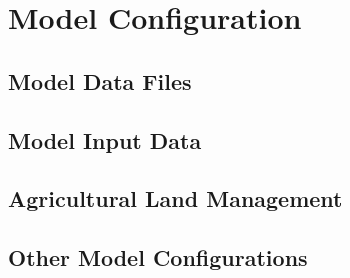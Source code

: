 \section{Model Configuration}
	\subsection{Model Data Files}
		
	\subsection{Model Input Data}
		
		
		
		
		
		
		
	\pagebreak
	\subsection{Agricultural Land Management}\label{sec:ag_land_mgt}
		

%		
		
	\pagebreak
	\subsection{Other Model Configurations}
		
		
		
		
		
\pagebreak